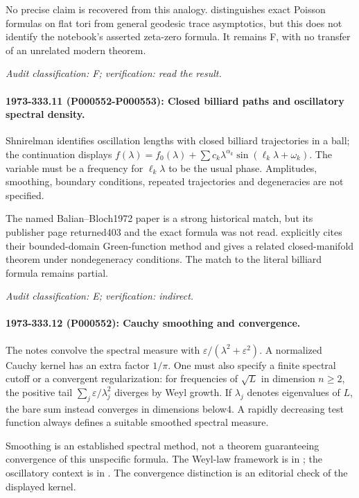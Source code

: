 No precise claim is recovered from this analogy. \citet[introduction]{colindeverdiere1973geodesicsii} distinguishes exact Poisson formulas on flat tori from general geodesic trace asymptotics, but this does not identify the notebook’s asserted zeta-zero formula. It remains F, with no transfer of an unrelated modern theorem.

\emph{Audit classification: F; verification: read the result.}

\paragraph{1973-333.11 (P000552-P000553): Closed billiard paths and oscillatory spectral density.}
Shnirelman identifies oscillation lengths with closed billiard trajectories in a ball; the continuation displays \(f(\lambda)=f_0(\lambda)+\sum c_k\lambda^{\alpha_k}\sin(\ell_k\lambda+\omega_k)\). The variable must be a frequency for \(\ell_k\lambda\) to be the usual phase. Amplitudes, smoothing, boundary conditions, repeated trajectories and degeneracies are not specified.

The named Balian--Bloch1972 paper is a strong historical match, but its publisher page returned403 and the exact formula was not read. \citet[introduction]{colindeverdiere1973geodesicsii} explicitly cites their bounded-domain Green-function method and gives a related closed-manifold theorem under nondegeneracy conditions. The match to the literal billiard formula remains partial.

\emph{Audit classification: E; verification: indirect.}

\paragraph{1973-333.12 (P000552): Cauchy smoothing and convergence.}
The notes convolve the spectral measure with \(\varepsilon/(\lambda^2+\varepsilon^2)\). A normalized Cauchy kernel has an extra factor \(1/\pi\). One must also specify a finite spectral cutoff or a convergent regularization: for frequencies of \(\sqrt L\) in dimension \(n\ge2\), the positive tail \(\sum_j\varepsilon/\lambda_j^2\) diverges by Weyl growth. If \(\lambda_j\) denotes eigenvalues of \(L\), the bare sum instead converges in dimensions below4. A rapidly decreasing test function always defines a suitable smoothed spectral measure.

Smoothing is an established spectral method, not a theorem guaranteeing convergence of this unspecific formula. The Weyl-law framework is in \citet[\S1]{mckeansinger1967curvature}; the oscillatory context is in \citet{colindeverdiere1973geodesicsii}. The convergence distinction is an editorial check of the displayed kernel.

